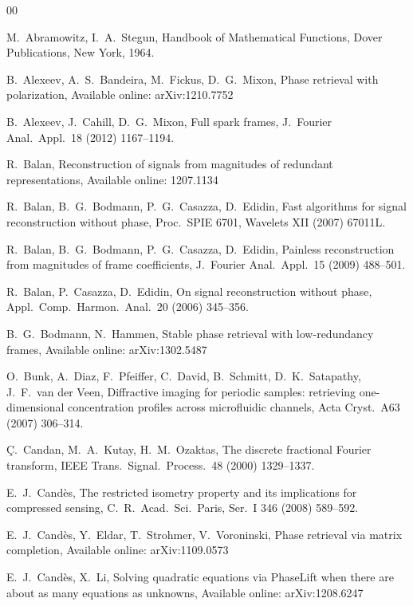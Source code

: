 \documentclass[times,10pt]{elsarticle}
\theoremstyle{plain}
\begin{document}
\begin{thebibliography}{00}

M.\ Abramowitz, I.\ A.\ Stegun, 
Handbook of Mathematical Functions, 
Dover Publications, New York, 1964. 

B.\ Alexeev, A.\ S.\ Bandeira, M.\ Fickus, D.\ G.\ Mixon,
Phase retrieval with polarization,
Available online: arXiv:1210.7752

B.\ Alexeev, J.\ Cahill, D.\ G.\ Mixon,
Full spark frames,
J.\ Fourier Anal.\ Appl.\ 18 (2012) 1167--1194.

R.\ Balan,
Reconstruction of signals from magnitudes of redundant representations,
Available online: 1207.1134

R.\ Balan, B.\ G.\ Bodmann, P.\ G.\ Casazza, D.\ Edidin, 
Fast algorithms for signal reconstruction without phase,
Proc.\ SPIE 6701, Wavelets XII (2007) 67011L.

R.\ Balan, B.\ G.\ Bodmann, P.\ G.\ Casazza, D.\ Edidin, 
Painless reconstruction from magnitudes of frame coefficients, 
J.\ Fourier Anal.\ Appl.\ 15 (2009) 488--501.

R.\ Balan, P.\ Casazza, D.\ Edidin,
On signal reconstruction without phase,
Appl.\ Comp.\ Harmon.\ Anal.\ 20 (2006) 345--356.

B.\ G.\ Bodmann, N.\ Hammen,
Stable phase retrieval with low-redundancy frames,
Available online: arXiv:1302.5487

O.\ Bunk, A.\ Diaz, F.\ Pfeiffer, C.\ David, B.\ Schmitt, D.\ K.\ Satapathy, J.\ F.\ van der Veen,
Diffractive imaging for periodic samples: retrieving one-dimensional concentration profiles across microfluidic channels, 
Acta Cryst.\ A63 (2007) 306--314.

\c{C}.\ Candan, M.\ A.\ Kutay, H.\ M.\ Ozaktas,
The discrete fractional Fourier transform,
IEEE Trans.\ Signal.\ Process.\ 48 (2000) 1329--1337.

E.\ J.\ Cand\`{e}s,
The restricted isometry property and its implications for compressed sensing,
C.\ R.\ Acad.\ Sci.\ Paris, Ser.\ I 346 (2008) 589--592.

E.\ J.\ Cand\`{e}s, Y.\ Eldar, T.\ Strohmer, V.\ Voroninski, 
Phase retrieval via matrix completion,
Available online: arXiv:1109.0573

E.\ J.\ Cand\`{e}s, X.\ Li, 
Solving quadratic equations via PhaseLift when there are about as many equations as unknowns, 
Available online: arXiv:1208.6247


\end{thebibliography}
\end{document}
